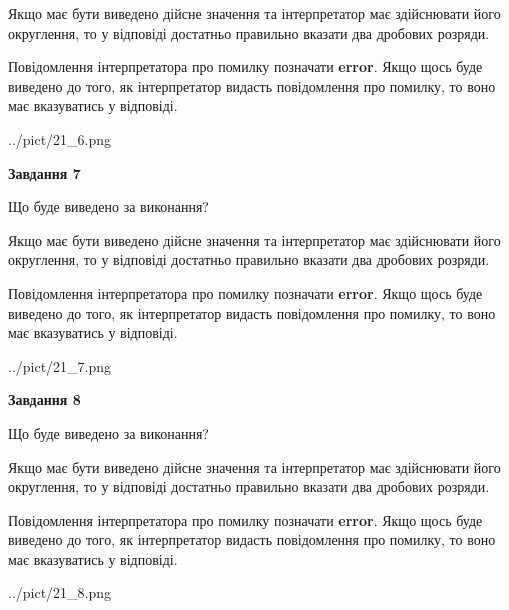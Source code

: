 \documentclass[12pt, ukrainian]{article}
\begin{document}
{\begin {Large}
Якщо має бути виведено дійсне значення та інтерпретатор має здійснювати його округлення, 
то у відповіді достатньо правильно вказати два дробових розряди.

Повідомлення інтерпретатора про помилку позначати \textbf{error}.
Якщо щось буде виведено до того, як інтерпретатор видасть повідомлення про помилку, 
то воно має вказуватись у відповіді. \par

\begin{center}
	{../pict/21_6.png}
\end{center}
\newpage

{\begin {center}\textbf{Завдання 7}\end {center}}\par
Що буде виведено за виконання? \par

Якщо має бути виведено дійсне значення та інтерпретатор має здійснювати його округлення, 
то у відповіді достатньо правильно вказати два дробових розряди.

Повідомлення інтерпретатора про помилку позначати \textbf{error}.
Якщо щось буде виведено до того, як інтерпретатор видасть повідомлення про помилку, 
то воно має вказуватись у відповіді. \par

\begin{center}
	{../pict/21_7.png}
\end{center}
\newpage

{\begin {center}\textbf{Завдання 8}\end {center}}\par
Що буде виведено за виконання? \par

Якщо має бути виведено дійсне значення та інтерпретатор має здійснювати його округлення, 
то у відповіді достатньо правильно вказати два дробових розряди.

Повідомлення інтерпретатора про помилку позначати \textbf{error}.
Якщо щось буде виведено до того, як інтерпретатор видасть повідомлення про помилку, 
то воно має вказуватись у відповіді. \par

\begin{center}
	{../pict/21_8.png}
\end{center}
\newpage


\end{Large}}
\end{document}
